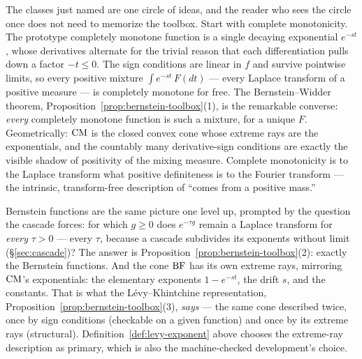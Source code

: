 \begin{remark}\label{rem:circle-of-ideas}
The classes just named are one circle of ideas, and the reader who sees the circle once
does not need to memorize the toolbox. Start with complete monotonicity. The prototype
completely monotone function is a single decaying exponential $e^{-st}$, whose
derivatives alternate for the trivial reason that each differentiation pulls down a
factor $-t \le 0$. The sign conditions are linear in $f$ and survive pointwise limits,
so every positive mixture $\int e^{-st}\,F(dt)$ --- every Laplace transform of a
positive measure --- is completely monotone for free. The Bernstein--Widder theorem,
Proposition~\ref{prop:bernstein-toolbox}(1), is the remarkable converse: \emph{every}
completely monotone function is such a mixture, for a unique $F$. Geometrically: $\mathrm{CM}$
is the closed convex cone whose extreme rays are the exponentials, and the countably
many derivative-sign conditions are exactly the visible shadow of positivity of the
mixing measure. Complete monotonicity is to the Laplace transform what positive
definiteness is to the Fourier transform --- the intrinsic, transform-free description
of ``comes from a positive mass.''

Bernstein functions are the same picture one level up, prompted by the question the
cascade forces: for which $g \ge 0$ does $e^{-\tau g}$ remain a Laplace transform for
\emph{every} $\tau > 0$ --- every $\tau$, because a cascade subdivides its exponents
without limit (\S\ref{sec:cascade})? The answer is
Proposition~\ref{prop:bernstein-toolbox}(2): exactly the Bernstein functions. And the
cone $\mathrm{BF}$ has its own extreme rays, mirroring $\mathrm{CM}$'s exponentials: the elementary
exponents $1 - e^{-st}$, the drift $s$, and the constants. That is what the
Lévy--Khintchine representation, Proposition~\ref{prop:bernstein-toolbox}(3),
\emph{says} --- the same cone described twice, once by sign conditions (checkable on a
given function) and once by its extreme rays (structural). Definition~\ref{def:levy-exponent}
above chooses the extreme-ray description as primary, which is also the machine-checked
development's choice.


\end{remark}
